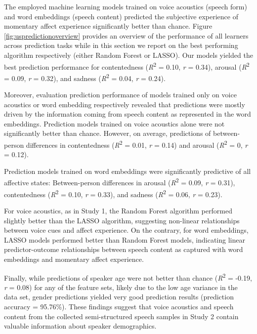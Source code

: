 \documentclass[
  man,floatsintext]{apa6}
\begin{document}
The employed machine learning models trained on voice acoustics (speech form) and word embeddings (speech content) predicted the subjective experience of momentary affect experience significantly better than chance. Figure \ref{fig:uspredictionoverview} provides an overview of the performance of all learners across prediction tasks while in this section we report on the best performing algorithm respectively (either Random Forest or LASSO).
Our models yielded the best prediction performance for contentedness (\emph{R}\textsuperscript{2} = 0.10, \emph{r} = 0.34), arousal (\emph{R}\textsuperscript{2} = 0.09, \emph{r} = 0.32), and sadness (\emph{R}\textsuperscript{2} = 0.04, \emph{r} = 0.24).

Moreover, evaluation prediction performance of models trained only on voice acoustics or word embedding respectively revealed that predictions were mostly driven by the information coming from speech content as represented in the word embeddings. Prediction models trained on voice acoustics alone were not significantly better than chance. However, on average, predictions of between-person differences in contentedness (\emph{R}\textsuperscript{2} = 0.01, \emph{r} = 0.14) and arousal (\emph{R}\textsuperscript{2} = 0, \emph{r} = 0.12).

Prediction models trained on word embeddings were significantly predictive of all affective states: Between-person differences in arousal (\emph{R}\textsuperscript{2} = 0.09, \emph{r} = 0.31), contentedness (\emph{R}\textsuperscript{2} = 0.10, \emph{r} = 0.33), and sadness (\emph{R}\textsuperscript{2} = 0.06, \emph{r} = 0.23).

For voice acoustics, as in Study 1, the Random Forest algorithm performed slightly better than the LASSO algorithm, suggesting non-linear relationships between voice cues and affect experience. On the contrary, for word embeddings, LASSO models performed better than Random Forest models, indicating linear predictor-outcome relationships between speech content as captured with word embeddings and momentary affect experience.

Finally, while predictions of speaker age were not better than chance (\emph{R}\textsuperscript{2} = -0.19, \emph{r} = 0.08) for any of the feature sets, likely due to the low age variance in the data set, gender predictions yielded very good prediction results (prediction accuracy = 95.76\%). These findings suggest that voice acoustics and speech content from the collected semi-structured speech samples in Study 2 contain valuable information about speaker demographics.
\end{document}
